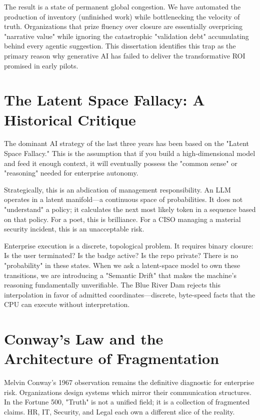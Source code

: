 \documentclass[12pt,a4paper,oneside]{book}
\begin{document}
The result is a state of permanent global congestion. We have automated the production of inventory (unfinished work) while bottlenecking the velocity of truth. Organizations that prize fluency over closure are essentially overpricing "narrative value" while ignoring the catastrophic "validation debt" accumulating behind every agentic suggestion. This dissertation identifies this trap as the primary reason why generative AI has failed to deliver the transformative ROI promised in early pilots.

\section{The Latent Space Fallacy: A Historical Critique}
The dominant AI strategy of the last three years has been based on the "Latent Space Fallacy." This is the assumption that if you build a high-dimensional model and feed it enough context, it will eventually possess the "common sense" or "reasoning" needed for enterprise autonomy. 

Strategically, this is an abdication of management responsibility. An LLM operates in a latent manifold—a continuous space of probabilities. It does not "understand" a policy; it calculates the next most likely token in a sequence based on that policy. For a poet, this is brilliance. For a CISO managing a material security incident, this is an unacceptable risk. 

Enterprise execution is a discrete, topological problem. It requires binary closure: Is the user terminated? Is the badge active? Is the repo private? There is no "probability" in these states. When we ask a latent-space model to own these transitions, we are introducing a "Semantic Drift" that makes the machine's reasoning fundamentally unverifiable. The Blue River Dam rejects this interpolation in favor of admitted coordinates—discrete, byte-speed facts that the CPU can execute without interpretation.

\section{Conway's Law and the Architecture of Fragmentation}
Melvin Conway’s 1967 observation remains the definitive diagnostic for enterprise risk. Organizations design systems which mirror their communication structures. In the Fortune 500, "Truth" is not a unified field; it is a collection of fragmented claims. HR, IT, Security, and Legal each own a different slice of the reality. 
\end{document}
